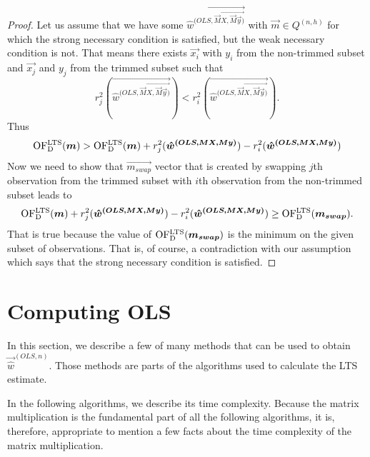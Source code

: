 \begin{proof}
		Let us assume that we have some $\vec{\hat{w}^{(OLS, \vec{M}\vec{X, \vec{M}\vec{y})} }}$ with $\vec{m} \in Q^{(n, h)}$ for which the strong necessary condition is satisfied, but the weak necessary condition is not. That means there exists $\vec{x_i}$ with $y_i$ from the non-trimmed subset and $\vec{x_j}$ and $y_j$ from the trimmed subset such that
		\begin{equation*} 
			r_j^2(\vec{\hat{w}^{(OLS, \vec{M}\vec{X, \vec{M}\vec{y})} }}) < r_i^2(\vec{\hat{w}^{(OLS, \vec{M}\vec{X, \vec{M}\vec{y})} }}).
	\end{equation*}
		 Thus 
    \begin{equation} 
        \operatorname{OF^{LTS}_D}(\boldsymbol{m}) > \operatorname{OF^{LTS}_D}(\boldsymbol{m}) + r_j^2(\boldsymbol{\hat{w}^{(OLS, \boldsymbol{M}\boldsymbol{X, \boldsymbol{M}\boldsymbol{y})} }}) - r_i^2(\boldsymbol{\hat{w}^{(OLS, \boldsymbol{M}\boldsymbol{X, \boldsymbol{M}\boldsymbol{y})} }})  
    \end{equation}
Now we need to show that $\vec{m_{swap}}$ vector that is created by swapping $j$th observation from the trimmed subset with $i$th observation from the non-trimmed subset leads to 
    \begin{equation} 
      \operatorname{OF^{LTS}_D}(\boldsymbol{m}) + r_j^2(\boldsymbol{\hat{w}^{(OLS, \boldsymbol{M}\boldsymbol{X, \boldsymbol{M}\boldsymbol{y})} }}) - r_i^2(\boldsymbol{\hat{w}^{(OLS, \boldsymbol{M}\boldsymbol{X, \boldsymbol{M}\boldsymbol{y})} }})  \geq \operatorname{OF^{LTS}_D}(\boldsymbol{m_{swap}}).
    \end{equation}
That is true because the value of $\operatorname{OF^{LTS}_D}(\boldsymbol{m_{swap}})$ is the minimum on the given subset of observations. That is, of course, a contradiction with our assumption which says that the strong necessary condition is satisfied. 
\end{proof}



\section{Computing OLS}
In this section, we describe a few of many methods that can be used to obtain  $\vec{\hat{w}}^{(OLS,n)}$. Those methods are parts of the algorithms used to calculate the LTS estimate. 

In the following algorithms, we describe its time complexity. Because the matrix multiplication is the fundamental part of all the following algorithms, it is, therefore, appropriate to mention a few facts about the time complexity of the matrix multiplication. 


